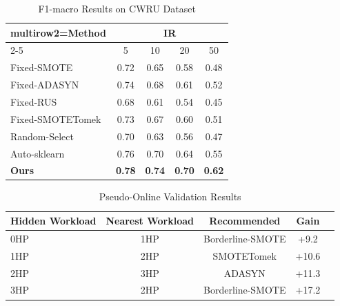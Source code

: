 \begin{table}[htbp]
\centering
\caption{F1-macro Results on CWRU Dataset}
\label{tab:results}
\begin{tabular}{|l|c|c|c|c|}
\toprule
multirow{2}{=}{Method} & \multicolumn{4}{c}{IR} \\
\cmidrule{2-5}
 & 5 & 10 & 20 & 50 \\ \midrule
Fixed-SMOTE & 0.72 & 0.65 & 0.58 & 0.48 \\
Fixed-ADASYN & 0.74 & 0.68 & 0.61 & 0.52 \\
Fixed-RUS & 0.68 & 0.61 & 0.54 & 0.45 \\
Fixed-SMOTETomek & 0.73 & 0.67 & 0.60 & 0.51 \\
Random-Select & 0.70 & 0.63 & 0.56 & 0.47 \\
Auto-sklearn & 0.76 & 0.70 & 0.64 & 0.55 \\
\textbf{Ours} & \textbf{0.78} & \textbf{0.74} & \textbf{0.70} & \textbf{0.62} \\
\bottomrule
\end{tabular}
\end{table}

\begin{table}[htbp]
\centering
\caption{Pseudo-Online Validation Results}
\label{tab:pseudo_online}
\begin{tabular}{|l|c|c|c|c|}
\toprule
Hidden Workload & Nearest Workload & Recommended & Gain \\ \midrule
0HP & 1HP & Borderline-SMOTE & +9.2\\
1HP & 2HP & SMOTETomek & +10.6\\
2HP & 3HP & ADASYN & +11.3\\
3HP & 2HP & Borderline-SMOTE & +17.2\\
\bottomrule
\end{tabular}
\end{table}